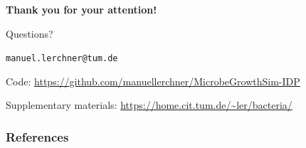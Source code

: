 \documentclass[10pt,t]{beamer}
\begin{document}
\begin{frame}
    \begin{center}
        \vspace{1cm}
        {\LARGE \textbf{Thank you for your attention!}}

        \vspace{1.5cm}

        \Huge{Questions?}

        \vspace{1.5cm}

        \normalsize
        \texttt{manuel.lerchner@tum.de}

        \vspace{0.3cm}

        \small
        Code: \url{https://github.com/manuellerchner/MicrobeGrowthSim-IDP}

        \vspace{0.2cm}

        Supplementary materials: \url{https://home.cit.tum.de/~ler/bacteria/}
    \end{center}
\end{frame}

\begin{frame}
    \frametitle{References}
    \footnotesize
    
    
\end{frame}


\appendix
\end{document}
